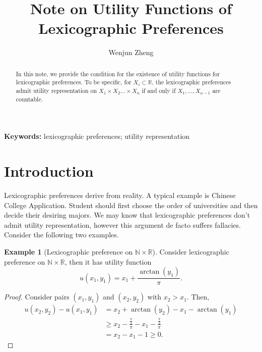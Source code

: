 \documentclass[a4paper, 12pt]{article}
\title{Note on Utility Functions of Lexicographic Preferences}
\date{}
\author{Wenjun Zheng}
\theoremstyle{definition}
\newtheorem{example}{Example}
\begin{document}
\maketitle
\begin{abstract}
In this note, we provide the condition for the existence of utility functions for lexicographic preferences. To be specific, for $X_i\subset\mathbb{R}$, the lexicographic preferences admit utility representation on $X_1\times X_2\dots\times X_n$ if and only if $X_1,\dots,X_{n-1}$ are countable. 
\end{abstract}

\textbf{Keywords: }lexicographic preferences; utility representation

\section{Introduction}
Lexicographic preferences derive from reality. A typical example is Chinese College Application. Student should first choose the order of universities and then decide their desiring majors. We may know that lexicographic preferences don't admit utility representation, however this argument de facto suffers fallacies. Consider the following two examples.
\begin{example}[Lexicographic preference on $\mathbb{N}\times\mathbb{R}$]
Consider lexicographic preference on $\mathbb{N}\times\mathbb{R}$, then it has utility function
\[
u(x_1,y_1)=x_1+\frac{\arctan(y_1)}{\pi}.
\]
\begin{proof}
Consider pairs $(x_1,y_1)$ and $(x_2,y_2)$ with $x_2>x_1$. Then,
\begin{align*}
u(x_2,y_2)-u(x_1,y_1)&=x_2+\arctan(y_2)-x_1-\arctan(y_1)\\
&\geq x_2-\frac{\frac{\pi}{2}}{\pi}-x_1-\frac{\frac{\pi}{2}}{\pi}\\
&=x_2-x_1-1\geq 0.
\end{align*}
\end{proof}
\end{example}
\end{document}
